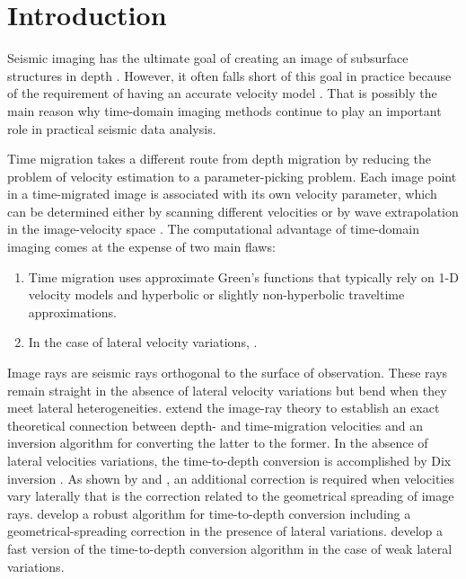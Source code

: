 \section{Introduction}

Seismic imaging has the ultimate goal of creating an image of
subsurface structures in depth
\cite[]{GEO66-05-16221640,bednar2005brief,biondi,etgen}. However, it often falls
short of this goal in practice because of the requirement of having an
accurate velocity model \cite[]{landa,landa2}. That is possibly the
main reason why time-domain imaging methods continue to play an important role in practical seismic
data analysis.

Time migration takes a different route from depth migration by
reducing the problem of velocity estimation to a
parameter-picking problem. Each image point in a time-migrated
image is associated with its own velocity parameter, which can be
determined either by scanning different velocities
\cite[]{GEO66-06-16991713} or by wave extrapolation in the
image-velocity space \cite[]{fomel2003time}. The computational
advantage of time-domain imaging comes at the expense of two main
flaws:
\begin{enumerate}
\item Time migration uses approximate Green's functions  that typically
  rely on 1-D velocity models and hyperbolic or slightly
  non-hyperbolic traveltime approximations.
\item In the case of lateral velocity variations,  \cite[]{hubral1977time}.
\end{enumerate}

Image rays are seismic rays orthogonal to the surface of
observation. These rays remain straight in the absence of lateral
velocity variations but bend when they meet lateral heterogeneities.
\cite{ip,cameron2008time,jcp} extend the image-ray theory to establish an exact
theoretical connection between depth- and time-migration velocities
and an inversion algorithm for converting the latter to the former. In
the absence of lateral velocities variations, the time-to-depth
conversion is accomplished by Dix
inversion \cite{GEO20-01-00680086}. As shown by \cite{ip} and
\cite{tygel}, an additional correction is required when velocities
vary laterally that is the correction related to the geometrical spreading
of image rays. \cite{siwei,siwei2} develop a robust algorithm for
time-to-depth conversion including a geometrical-spreading correction
in the presence of lateral variations. \cite{sripanich2018fast} develop a fast version of the time-to-depth conversion algorithm in the case of weak lateral variations. 

